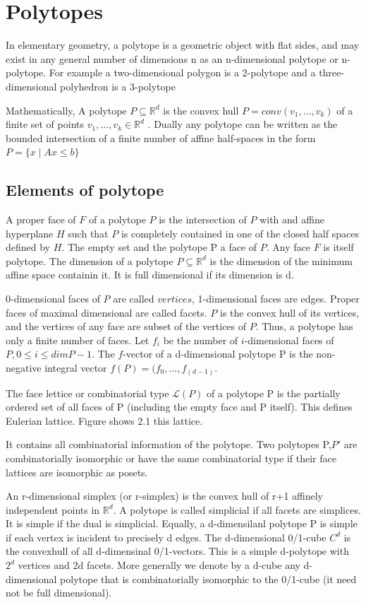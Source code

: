 \section{Polytopes}

In elementary geometry, a polytope is a geometric object with flat sides, and may exist in any general number of dimensions n as an n-dimensional polytope or n-polytope. For example a two-dimensional polygon is a 2-polytope and a three-dimensional polyhedron is a 3-polytope

Mathematically, A polytope $P\subseteq \mathbb{R}^d$ is the convex hull $P=conv(v_1,...,v_k)$ of a finite set of points $v_1,...,v_k \in \mathbb{R}^d$ . Dually any polytope can be written as the bounded intersection of a finite number of affine half-spaces in the form $P = \{ x\mid Ax \leq b \}$

\subsection{Elements of polytope}
A proper face of $F$ of a polytope $P$ is the intersection of $P$ with and affine hyperplane $H$ such that $P$ is completely contained in one of the closed half spaces defined by $H$. The empty set and the polytope P a face of $P$. Any face $F$ is itself  polytope. The dimension of a polytope $P \subseteq \mathbb{R}^d$ is the dimension of the minimum affine space containin it. It is full dimensional if its dimension is d.

0-dimensional faces of $P$ are called $vertices$, 1-dimensional faces are edges. Proper faces of maximal dimensional are called facets. $P$ is the convex hull of its vertices, and the vertices of any face are subset of the vertices of $P$. Thus, a polytope has only a finite number of faces. Let $f_i$ be the number of $i$-dimensional faces of $P,0 \leq i \leq dim P-1$. The $f$-vector of a d-dimensional polytope P is the non-negative integral vector $f(P) = (f_0,...,f_(d-1)$.

The face lettice or combinatorial type $\mathcal{L}(P)$ of a polytope P is the partially ordered set of all faces of P (including the empty face and P itself). This defines Eulerian lattice. Figure shows 2.1 this lattice.


It contains all combinatorial information of the polytope. Two polytopes P,$P'$ are combinatorially isomorphic or have the same combinatorial type if their face lattices are isomorphic as posets.

An r-dimensional simplex (or r-simplex) is the convex hull of r+1 affinely independent points in $\mathbb{R}^d$. A polytope is called simplicial if all facets are simplices. It is simple if the dual is simplicial. Equally, a d-dimensilanl polytope P is simple if each vertex is incident to precisely d edges. The d-dimensional 0/1-cube $C^d$ is the convexhull of all d-dimensinal 0/1-vectors. This is a simple d-polytope with $2^d$ vertices and 2d facets. More generally we denote by a d-cube any d-dimensional polytope that is combinatorially isomorphic to the 0/1-cube (it need not be full dimensional).

